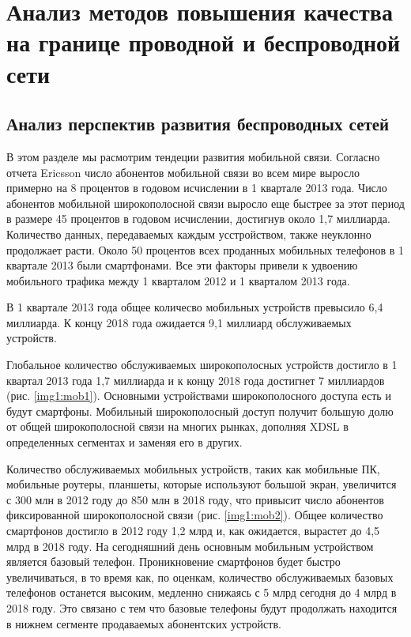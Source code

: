 \chapter{Анализ методов повышения качества на границе проводной и беспроводной сети} \label{chapt1}


\section{Анализ перспектив развития беспроводных сетей} \label{sect1_0}
В этом разделе мы расмотрим тендеции развития мобильной связи.
Согласно отчета Ericsson \cite{ericsson} число абонентов мобильной связи во всем мире выросло примерно на 8 процентов в годовом исчислении в 1 квартале 2013 года. Число абонентов мобильной широкополосной связи выросло еще быстрее за этот период в размере 45 процентов в годовом исчислении, достигнув около 1,7 миллиарда. Количество данных, передаваемых каждым усстройством, также неуклонно продолжает расти. Около 50 процентов всех проданных мобильных телефонов в 1 квартале 2013 были смартфонами. Все эти факторы привели к удвоению мобильного трафика между 1 кварталом 2012 и 1 кварталом 2013 года. 

В 1 квартале 2013 года общее количесво мобильных устройств превысило 6,4 миллиарда. К концу 2018 года ожидается 9,1 миллиард обслуживаемых устройств. 

Глобальное количество обслуживаемых широкополосных устройств достигло в 1 квартал 2013 года 1,7 миллиарда и к концу 2018 года достигнет 7 миллиардов (рис. \ref{img1:mob1}). Основными устройствами широкополосного доступа есть и будут смартфоны. Мобильный широкополосный доступ получит большую долю от общей широкополосной связи на многих рынках, дополняя XDSL в определенных сегментах и заменяя его в других. 

Количество обслуживаемых мобильных устройств, таких как мобильные ПК, мобильные роутеры, планшеты, которые используют большой экран, увеличится с 300 млн в 2012 году до 850 млн в 2018 году, что привысит число абонентов фиксированной широкополосной связи (рис. \ref{img1:mob2}).
Общее количество смартфонов достигло в 2012 году 1,2 млрд и, как ожидается, вырастет до 4,5 млрд в 2018 году. На сегодняшний день основным мобильным устройством является базовый телефон. Проникновение смартфонов будет быстро увеличиваться, в то время как, по оценкам, количество обслуживаемых базовых телефонов останется высоким, медленно снижаясь с 5 млрд сегодня до 4 млрд в 2018 году. Это связано с тем что базовые телефоны будут продолжать находится в нижнем сегменте продаваемых абонентских устройств.

